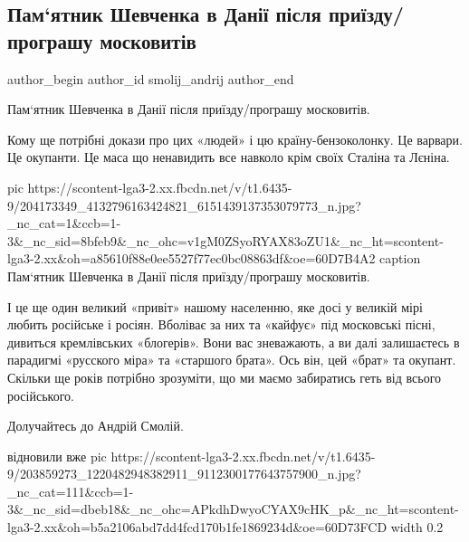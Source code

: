  
 
 
 
 
 
\subsection{Пам‘ятник Шевченка в Данії після приїзду/програшу московитів}
\label{sec:22_06_2021.fb.smolij_andrij.1.shevchenko_pamjatnik_dania}
\ifcmt
 author_begin
   author_id smolij_andrij
 author_end
\fi

Пам‘ятник Шевченка в Данії після приїзду/програшу московитів. 

Кому ще потрібні докази про цих «людей» і цю країну-бензоколонку. Це варвари.
Це окупанти. Це маса що ненавидить все навколо крім своїх Сталіна та Лєніна.

\ifcmt
  pic https://scontent-lga3-2.xx.fbcdn.net/v/t1.6435-9/204173349_4132796163424821_6151439137353079773_n.jpg?_nc_cat=1&ccb=1-3&_nc_sid=8bfeb9&_nc_ohc=v1gM0ZSyoRYAX83oZU1&_nc_ht=scontent-lga3-2.xx&oh=a85610f88e0ee5527f77ec0bc08863df&oe=60D7B4A2
	caption Пам‘ятник Шевченка в Данії після приїзду/програшу московитів. 
\fi

І це ще один великий «привіт» нашому населенню, яке досі у великій мірі любить
російське і росіян. Вболіває за них та «кайфує» під московські пісні, дивиться
кремлівських «блогерів». Вони вас зневажають, а ви далі залишаєтесь в парадигмі
«русского міра» та «старшого брата». Ось він, цей «брат» та окупант. Скільки ще
років потрібно зрозуміти, що ми маємо забиратись геть від всього російського.

Долучайтесь до Андрій Смолій.


відновили вже
\ifcmt
  pic https://scontent-lga3-2.xx.fbcdn.net/v/t1.6435-9/203859273_1220482948382911_9112300177643757900_n.jpg?_nc_cat=111&ccb=1-3&_nc_sid=dbeb18&_nc_ohc=APkdhDwyoCYAX9cHK_p&_nc_ht=scontent-lga3-2.xx&oh=b5a2106abd7dd4fcd170b1fe1869234d&oe=60D73FCD
  width 0.2
\fi
